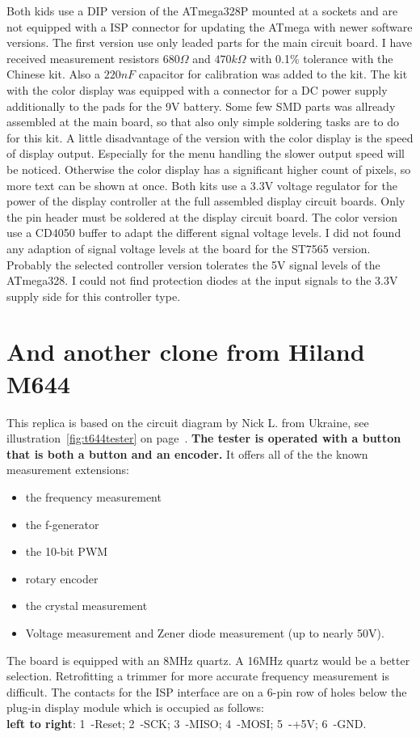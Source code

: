 Both kids use a DIP version of the ATmega328P mounted at a sockets and are
not equipped with a ISP connector for updating the ATmega with newer software versions.
The first version use
only leaded parts for the main circuit board. 
I have received measurement resistors \(680\Omega\) and \(470k\Omega\) with 0.1\% tolerance
with the Chinese kit. Also a \(220 nF\) capacitor for calibration was added
to the kit.
The kit with the color display was equipped with a connector for a DC power supply additionally
to the pads for the 9V battery.
Some few SMD parts was allready assembled at the main board, so that also only simple soldering
tasks are to do for this kit. 
A little disadvantage of the version with the color display is the speed of display output.
Especially for the menu handling the slower output speed will be noticed.
Otherwise the color display has a significant higher count of pixels, so more text can be shown at once.
Both kits use a 3.3V voltage regulator for the power of the display controller at the
full assembled display circuit boards.
Only the pin header must be soldered at the display circuit board.
The color version use a CD4050 buffer to adapt the different signal voltage levels.
I did not found any adaption of signal voltage levels at the board for the ST7565 version.
Probably the selected controller version tolerates the 5V signal levels of the ATmega328.
I could not find protection diodes at the input signals to the 3.3V supply side for this controller type.

\section{And another clone from Hiland M644}
\vspace*{-0.3cm}
This replica is based on the circuit diagram by Nick L. from Ukraine, see illustration~\ref{fig:t644tester} on page~\pageref{fig:t644tester}.
\textbf {The tester is operated with a button that is both a button and an encoder.}
It offers all of the the known measurement extensions:
\begin{itemize} \setlength{\itemsep}{-0.5em}
 \item the frequency measurement
 \item the f-generator
 \item the 10-bit PWM
 \item rotary encoder
 \item the crystal measurement
 \item Voltage measurement and Zener diode measurement (up to nearly 50V).
\end{itemize}
The board is equipped with an 8MHz quartz. A 16MHz quartz would be a better selection.
Retrofitting a trimmer for more accurate frequency measurement is difficult.
The contacts for the ISP interface are on a 6-pin row of holes below the
plug-in display module which is occupied as follows: \\
\textbf {left to right}: 1~-Reset; 2~-SCK; 3~-MISO; 4~-MOSI; 5~-+5V; 6~-GND.\\


